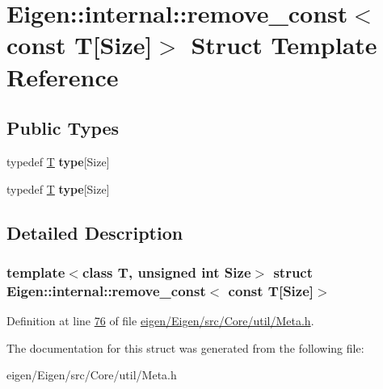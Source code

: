\hypertarget{struct_eigen_1_1internal_1_1remove__const_3_01const_01_t[_size]_4}{}\section{Eigen\+:\+:internal\+:\+:remove\+\_\+const$<$ const T\mbox{[}Size\mbox{]}$>$ Struct Template Reference}
\label{struct_eigen_1_1internal_1_1remove__const_3_01const_01_t[_size]_4}
\subsection*{Public Types}
\begin{DoxyCompactItemize}
\item 
\mbox{\label{struct_eigen_1_1internal_1_1remove__const_3_01const_01_t[_size]_4_ac07fc7701793f86e7a94f7e11e84af6e}} 
typedef \hyperlink{group___sparse_core___module}{T} {\bfseries type}\mbox{[}Size\mbox{]}
\item 
\mbox{\label{struct_eigen_1_1internal_1_1remove__const_3_01const_01_t[_size]_4_ac07fc7701793f86e7a94f7e11e84af6e}} 
typedef \hyperlink{group___sparse_core___module}{T} {\bfseries type}\mbox{[}Size\mbox{]}
\end{DoxyCompactItemize}


\subsection{Detailed Description}
\subsubsection*{template$<$class T, unsigned int Size$>$\newline
struct Eigen\+::internal\+::remove\+\_\+const$<$ const T\mbox{[}\+Size\mbox{]}$>$}



Definition at line \hyperlink{eigen_2_eigen_2src_2_core_2util_2_meta_8h_source_l00076}{76} of file \hyperlink{eigen_2_eigen_2src_2_core_2util_2_meta_8h_source}{eigen/\+Eigen/src/\+Core/util/\+Meta.\+h}.



The documentation for this struct was generated from the following file\+:\begin{DoxyCompactItemize}
\item 
eigen/\+Eigen/src/\+Core/util/\+Meta.\+h\end{DoxyCompactItemize}
